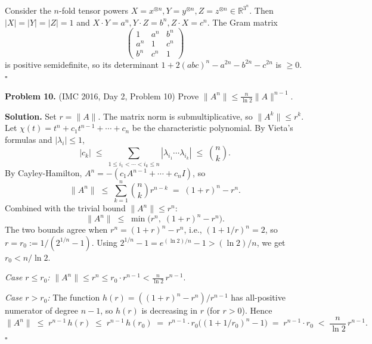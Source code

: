 \documentclass{article}
\newcommand{\R}{\mathbb{R}}
\begin{document}
Consider the \( n \)-fold tensor powers \( X = x^{\otimes n}, Y = y^{\otimes n}, Z = z^{\otimes n} \in \R^{3^n} \). Then \( |X| = |Y| = |Z| = 1 \) and \( X \cdot Y = a^n, Y \cdot Z = b^n, Z \cdot X = c^n \). The Gram matrix
\[
\begin{pmatrix} 1 & a^n & b^n \\ a^n & 1 & c^n \\ b^n & c^n & 1 \end{pmatrix}
\]
is positive semidefinite, so its determinant \( 1 + 2(abc)^n - a^{2n} - b^{2n} - c^{2n} \) is \( \geq 0 \). \hfill\(\square\)

\bigskip
\textbf{Problem 10.} (IMC 2016, Day 2, Problem 10)
Prove \( \| A^n \| \leq \frac{n}{\ln 2} \| A \|^{n-1} \).

\textbf{Solution.}
Set \( r = \| A \| \). The matrix norm is submultiplicative, so \( \| A^k \| \leq r^k \). Let \( \chi(t) = t^n + c_1 t^{n-1} + \cdots + c_n \) be the characteristic polynomial. By Vieta's formulas and \( |\lambda_i| \leq 1 \),
\[
|c_k| \;\leq\; \sum_{1 \leq i_1 < \cdots < i_k \leq n} |\lambda_{i_1} \cdots \lambda_{i_k}| \;\leq\; \binom{n}{k}.
\]
By Cayley-Hamilton, \( A^n = -(c_1 A^{n-1} + \cdots + c_n I) \), so
\[
\| A^n \| \;\leq\; \sum_{k=1}^n \binom{n}{k} r^{n-k} \;=\; (1 + r)^n - r^n.
\]
Combined with the trivial bound \( \| A^n \| \leq r^n \):
\[
\| A^n \| \;\leq\; \min\bigl( r^n,\; (1+r)^n - r^n \bigr).
\]
The two bounds agree when \( r^n = (1+r)^n - r^n \), i.e., \( (1 + 1/r)^n = 2 \), so \( r = r_0 := 1/(2^{1/n} - 1) \). Using \( 2^{1/n} - 1 = e^{(\ln 2)/n} - 1 > (\ln 2)/n \), we get \( r_0 < n/\ln 2 \).

\emph{Case \( r \leq r_0 \):} \( \| A^n \| \leq r^n \leq r_0 \cdot r^{n-1} < \frac{n}{\ln 2}\, r^{n-1} \).

\emph{Case \( r > r_0 \):} The function \( h(r) = ((1+r)^n - r^n)/r^{n-1} \) has all-positive numerator of degree \( n-1 \), so \( h(r) \) is decreasing in \( r \) (for \( r > 0 \)). Hence
\[
\| A^n \| \;\leq\; r^{n-1}\, h(r) \;\leq\; r^{n-1}\, h(r_0) \;=\; r^{n-1} \cdot r_0\bigl((1 + 1/r_0)^n - 1\bigr) \;=\; r^{n-1} \cdot r_0 \;<\; \frac{n}{\ln 2}\, r^{n-1}.
\]
\hfill\(\square\)
\end{document}

